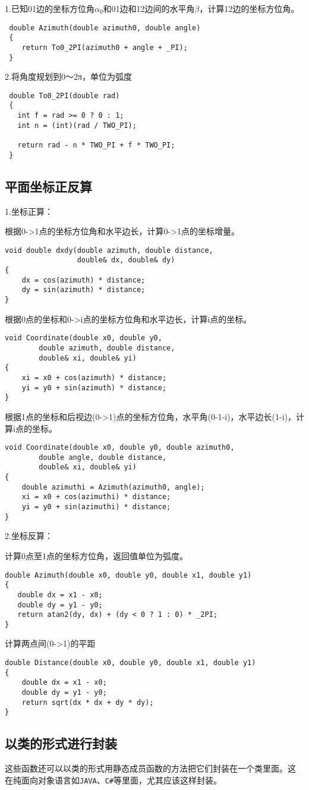  1.已知01边的坐标方位角$\alpha_0$和01边和12边间的水平角$\beta$，计算12边的坐标方位角。
 \begin{verbatim}
 double Azimuth(double azimuth0, double angle)
 {
    return To0_2PI(azimuth0 + angle + _PI);
 }
\end{verbatim}

 2.将角度规划到0～2π，单位为弧度
 \begin{verbatim}
 double To0_2PI(double rad)
 {
   int f = rad >= 0 ? 0 : 1;
   int n = (int)(rad / TWO_PI);

   return rad - n * TWO_PI + f * TWO_PI;
 }
 \end{verbatim}

\subsection{平面坐标正反算}
1.坐标正算：

根据0->1点的坐标方位角和水平边长，计算0->1点的坐标增量。
\begin{verbatim}
void double dxdy(double azimuth, double distance,
                 double& dx, double& dy)
{
    dx = cos(azimuth) * distance;
    dy = sin(azimuth) * distance;
}
\end{verbatim}

根据0点的坐标和0->i点的坐标方位角和水平边长，计算i点的坐标。
\begin{verbatim}
void Coordinate(double x0, double y0,
        double azimuth, double distance,
        double& xi, double& yi)
{
    xi = x0 + cos(azimuth) * distance;
    yi = y0 + sin(azimuth) * distance;
}
\end{verbatim}

根据1点的坐标和后视边(0->1)点的坐标方位角，水平角(0-1-i)，水平边长(1-i)，计算i点的坐标。
\begin{verbatim}
void Coordinate(double x0, double y0, double azimuth0,
        double angle, double distance,
        double& xi, double& yi)
{
    double azimuthi = Azimuth(azimuth0, angle);
    xi = x0 + cos(azimuthi) * distance;
    yi = y0 + sin(azimuthi) * distance;
}
\end{verbatim}

2.坐标反算：

计算0点至1点的坐标方位角，返回值单位为弧度。
\begin{verbatim}
double Azimuth(double x0, double y0, double x1, double y1)
{
   double dx = x1 - x0;
   double dy = y1 - y0;
   return atan2(dy, dx) + (dy < 0 ? 1 : 0) * _2PI;
}
\end{verbatim}

计算两点间(0->1)的平距
\begin{verbatim}
double Distance(double x0, double y0, double x1, double y1)
{
    double dx = x1 - x0;
    double dy = y1 - y0;
    return sqrt(dx * dx + dy * dy);
}
\end{verbatim}

\subsection{以类的形式进行封装}
这些函数还可以以类的形式用静态成员函数的方法把它们封装在一个类里面。这
在纯面向对象语言如\verb|JAVA|、\verb|C#|等里面，尤其应该这样封装。
